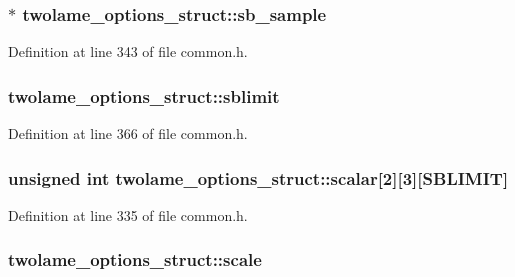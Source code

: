 \subsubsection[{\texorpdfstring{sb\+\_\+sample}{sb_sample}}]{$\ast$ twolame\+\_\+options\+\_\+struct\+::sb\+\_\+sample}\hypertarget{structtwolame__options__struct_a93b6e50f1d2c624f0d448fd49733841f}{}\label{structtwolame__options__struct_a93b6e50f1d2c624f0d448fd49733841f}


Definition at line 343 of file common.\+h.

\subsubsection[{\texorpdfstring{sblimit}{sblimit}}]{ twolame\+\_\+options\+\_\+struct\+::sblimit}\hypertarget{structtwolame__options__struct_ace0e0a1e04ffe3ec27bf782edac6973b}{}\label{structtwolame__options__struct_ace0e0a1e04ffe3ec27bf782edac6973b}


Definition at line 366 of file common.\+h.

\subsubsection[{\texorpdfstring{scalar}{scalar}}]{\setlength{\rightskip}{0pt plus 5cm}unsigned {\bf int} twolame\+\_\+options\+\_\+struct\+::scalar\mbox{[}2\mbox{]}\mbox{[}3\mbox{]}\mbox{[}{\bf S\+B\+L\+I\+M\+IT}\mbox{]}}\hypertarget{structtwolame__options__struct_a0e8c6e8c13d9e78799d794674514d0b4}{}\label{structtwolame__options__struct_a0e8c6e8c13d9e78799d794674514d0b4}


Definition at line 335 of file common.\+h.

\subsubsection[{\texorpdfstring{scale}{scale}}]{ twolame\+\_\+options\+\_\+struct\+::scale}\hypertarget{structtwolame__options__struct_a84946abd65a959f997ba582eed5da511}{}\label{structtwolame__options__struct_a84946abd65a959f997ba582eed5da511}


